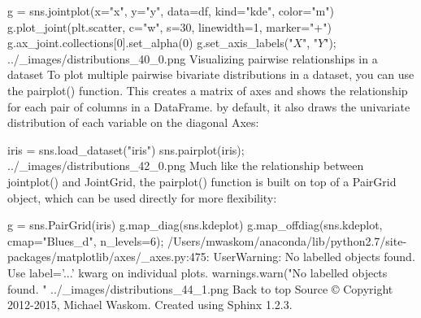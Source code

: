 g = sns.jointplot(x="x", y="y", data=df, kind="kde", color="m")
g.plot_joint(plt.scatter, c="w", s=30, linewidth=1, marker="+")
g.ax_joint.collections[0].set_alpha(0)
g.set_axis_labels("$X$", "$Y$");
../_images/distributions_40_0.png
Visualizing pairwise relationships in a dataset
To plot multiple pairwise bivariate distributions in a dataset, you can use the pairplot() function. This creates a matrix of axes and shows the relationship for each pair of columns in a DataFrame. by default, it also draws the univariate distribution of each variable on the diagonal Axes:

iris = sns.load_dataset("iris")
sns.pairplot(iris);
../_images/distributions_42_0.png
Much like the relationship between jointplot() and JointGrid, the pairplot() function is built on top of a PairGrid object, which can be used directly for more flexibility:

g = sns.PairGrid(iris)
g.map_diag(sns.kdeplot)
g.map_offdiag(sns.kdeplot, cmap="Blues_d", n_levels=6);
/Users/mwaskom/anaconda/lib/python2.7/site-packages/matplotlib/axes/_axes.py:475: UserWarning: No labelled objects found. Use label='...' kwarg on individual plots.
  warnings.warn("No labelled objects found. "
../_images/distributions_44_1.png
Back to top 
Source
© Copyright 2012-2015, Michael Waskom.
Created using Sphinx 1.2.3.
